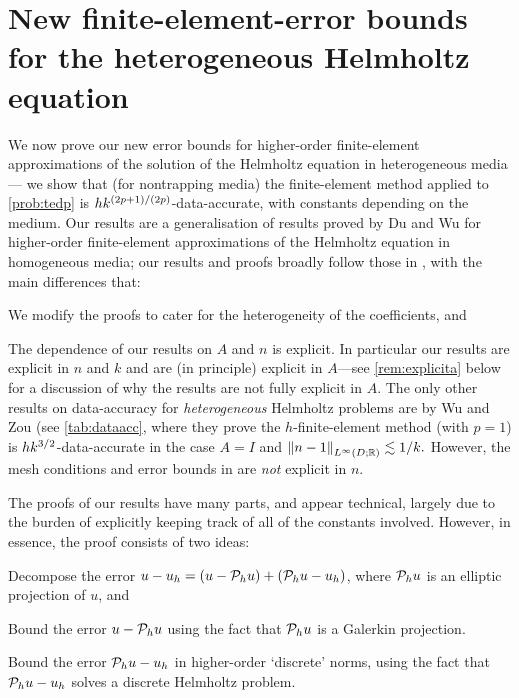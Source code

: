 
\section[FE Bounds for the Heterogeneous Helmholtz Equation]{New finite-element-error bounds for the heterogeneous Helmholtz equation}\label{sec:fem}

We now prove our new error bounds for higher-order finite-element approximations of the solution of the Helmholtz equation in heterogeneous media--- we show that (for nontrapping media) the finite-element method applied to \cref{prob:tedp} is $hk^{(2p+1)/(2p)}$-data-accurate, with constants depending on the medium. Our results are a generalisation of results proved by Du and Wu \cite{DuWu:15} for higher-order finite-element approximations of the Helmholtz equation in homogeneous media; our results and proofs broadly follow those in \cite{DuWu:15}, with the main differences that:
\ben
\item We modify the proofs to cater for the heterogeneity of the coefficients, and
\item The dependence of our results on $A$ and $n$ is explicit.
\een
  In particular our results are explicit in $n$ and $k$ and are (in principle) explicit in $A$---see \cref{rem:explicita} below for a discussion of why the results are not fully explicit in $A$. The only other results on data-accuracy for \emph{heterogeneous} Helmholtz problems are by Wu and Zou \cite[Lemma 3.3]{WuZo:18} (see \cref{tab:dataacc}, where they prove the $h$-finite-element method (with $p=1$) is $hk^{3/2}$-data-accurate in the case $A=I$ and $\NLiDRR{n-1} \lesssim 1/k.$ However, the mesh conditions and error bounds in \cite[Lemma 3.3]{WuZo:18} are \emph{not} explicit in $n.$

The proofs of our results have many parts, and appear technical, largely due to the burden of explicitly keeping track of all of the constants involved. However, in essence, the proof consists of two ideas:
\ben
\item Decompose the error $u-u_{h} = (u - \mathcal P_{h} u) + (\mathcal P_{h} u - u_{h})$, where $\mathcal P_{h} u$ is an elliptic projection of $u$, and
\item Bound the error $u - \mathcal P_{h} u$ using the fact that $\mathcal P_{h} u$ is a Galerkin projection.
\item Bound the error $\mathcal P_{h} u - u_{h}$ in higher-order `discrete' norms, using the fact that $\mathcal P_{h} u - u_{h}$ solves a discrete Helmholtz problem.
\een

